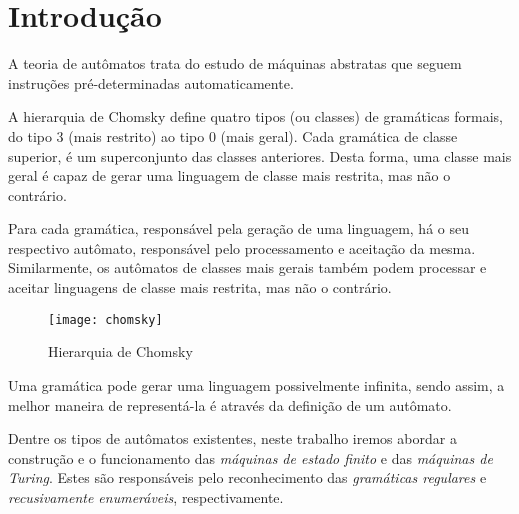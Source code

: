\section{Introdução}

A teoria de autômatos trata do estudo de máquinas abstratas que seguem
instruções pré-determinadas automaticamente.

A hierarquia de Chomsky define quatro tipos (ou classes) de gramáticas formais,
do tipo 3 (mais restrito) ao tipo 0 (mais geral). Cada gramática de classe
superior, é um superconjunto das classes anteriores. Desta forma, uma classe
mais geral é capaz de gerar uma linguagem de classe mais restrita, mas não o
contrário.

Para cada gramática, responsável pela geração de uma linguagem, há o seu
respectivo autômato, responsável pelo processamento e aceitação da mesma.
Similarmente, os autômatos de classes mais gerais também podem processar e
aceitar linguagens de classe mais restrita, mas não o contrário.

\begin{figure}[H]
    \centering
    \texttt{[image: chomsky]}
    \label{chomsky}
    \caption{Hierarquia de Chomsky \cite{fitch}}
\end{figure}

Uma gramática pode gerar uma linguagem possivelmente infinita, sendo assim, a
melhor maneira de representá-la é através da definição de um autômato.

Dentre os tipos de autômatos existentes, neste trabalho iremos abordar a
construção e o funcionamento das \emph{máquinas de estado finito} e das
\emph{máquinas de Turing}. Estes são responsáveis pelo reconhecimento das
\emph{gramáticas regulares } e \emph{recusivamente enumeráveis},
respectivamente.
